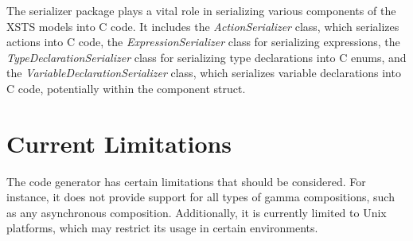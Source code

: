 The serializer package plays a vital role in serializing various components of the XSTS models into C code. It includes the \textit{ActionSerializer} class, which serializes actions into C code, the \textit{ExpressionSerializer} class for serializing expressions, the \textit{TypeDeclarationSerializer} class for serializing type declarations into C enums, and the \textit{VariableDeclarationSerializer} class, which serializes variable declarations into C code, potentially within the component struct.

\section{Current Limitations}

The code generator has certain limitations that should be considered. For instance, it does not provide support for all types of gamma compositions, such as any asynchronous composition. Additionally, it is currently limited to Unix platforms, which may restrict its usage in certain environments. 
